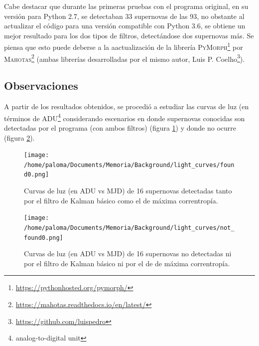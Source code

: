 Cabe destacar que durante las primeras pruebas con el programa original, en su versi\'on para Python 2.7, se detectaban 33 supernovas de las 93, no obstante al actualizar el c\'odigo para una versi\'on compatible con Python 3.6, se obtiene un mejor resultado para los dos tipos de filtros, detect\'andose dos supernovas m\'as. Se piensa que esto puede deberse a la aactualizaci\'on de la librer\'ia \textsc{PyMorph}\footnote{\url{https://pythonhosted.org/pymorph/}} por \textsc{Mahotas}\footnote{\url{https://mahotas.readthedocs.io/en/latest/}} (ambas librer\'ias desarrolladas por el mismo autor, Luis P. Coelho\footnote{\url{https://github.com/luispedro}}). 

\bigskip

\subsection{Observaciones}
A partir de los resultados obtenidos, se procedi\'o a estudiar las curvas de luz (en t\'erminos de ADU\footnote{analog-to-digital unit} considerando escenarios en donde supernovas conocidas son detectadas por el programa (con ambos filtros) (figura \ref{fig:sns_found}) y donde no ocurre (figura \ref{fig:sns_not_found}). 

\begin{figure}[h!]
\centering
\texttt{[image: /home/paloma/Documents/Memoria/Background/light\_curves/found0.png]}
\caption{Curvas de luz (en ADU vs MJD) de 16 supernovas detectadas tanto por el filtro de Kalman b\'asico como el de m\'axima correntrop\'ia.}
\label{fig:sns_found}
\end{figure}

\begin{figure}[h!]
\centering
\texttt{[image: /home/paloma/Documents/Memoria/Background/light\_curves/not\_found0.png]}
\caption{Curvas de luz (en ADU vs MJD) de 16 supernovas no detectadas ni por el filtro de Kalman b\'asico ni por el de de m\'axima correntrop\'ia.}
\label{fig:sns_not_found}
\end{figure}

